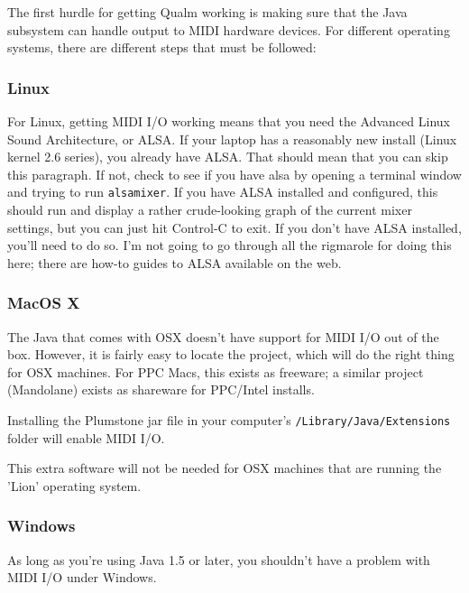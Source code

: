 \documentclass{article}
\newcommand{\q}{{\textsf{Qualm}}\xspace}
\newcommand{\code}[1]{{\tt #1}}
\begin{document}
The first hurdle for getting \q working is making sure that the Java
subsystem can handle output to MIDI hardware devices.  For different
operating systems, there are different steps that must be followed:

\subsubsection{Linux}

For Linux, getting MIDI I/O working means that you need the Advanced
Linux Sound Architecture, or ALSA.  If your laptop has a reasonably
new install (Linux kernel 2.6 series), you already have ALSA.  That
should mean that you can skip this paragraph.  If not, check to see if
you have alsa by opening a terminal window and trying to run
\code{alsamixer}.  If you have ALSA installed and configured, this
should run and display a rather crude-looking graph of the current
mixer settings, but you can just hit Control-C to exit.  If you don't
have ALSA installed, you'll need to do so.  I'm not going to go
through all the rigmarole for doing this here; there are how-to guides
to ALSA available on the web.

\subsubsection{MacOS X}

The Java that comes with OSX doesn't have support for MIDI I/O out of
the box.  However, it is fairly easy to locate the
 project, which will
do the right thing for OSX machines.  For PPC Macs, this exists as
freeware; a similar project (Mandolane) exists as shareware for
PPC/Intel installs.

Installing the Plumstone jar file in your computer's
\code{/Li\-bra\-ry/Ja\-va/Ex\-ten\-sions} folder will enable MIDI I/O.

This extra software will not be needed for OSX machines that are running
the 'Lion' operating system.

\subsubsection{Windows}

As long as you're using Java 1.5 or later, you shouldn't have a
problem with MIDI I/O under Windows.
\end{document}
